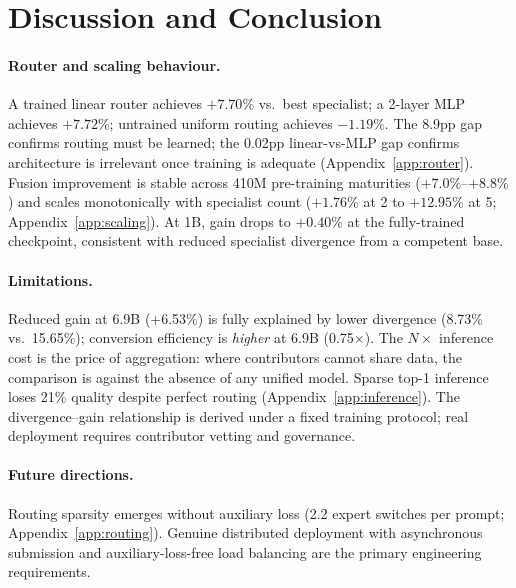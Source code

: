 \documentclass{article}
\begin{document}
\section{Discussion and Conclusion}
\label{sec:discussion}
\label{sec:conclusion}
\label{sec:analysis}

\paragraph{Router and scaling behaviour.} A trained linear router achieves $+7.70\%$ vs.\ best specialist; a 2-layer MLP achieves $+7.72\%$; untrained uniform routing achieves $-1.19\%$. The 8.9pp gap confirms routing must be learned; the 0.02pp linear-vs-MLP gap confirms architecture is irrelevant once training is adequate (Appendix~\ref{app:router}). Fusion improvement is stable across 410M pre-training maturities ($+7.0\%$--$+8.8\%$) and scales monotonically with specialist count ($+1.76\%$ at 2 to $+12.95\%$ at 5; Appendix~\ref{app:scaling}). At 1B, gain drops to $+0.40\%$ at the fully-trained checkpoint, consistent with reduced specialist divergence from a competent base.

\paragraph{Limitations.} Reduced gain at 6.9B (+6.53\%) is fully explained by lower divergence (8.73\% vs.\ 15.65\%); conversion efficiency is \emph{higher} at 6.9B (0.75$\times$). The $N\times$ inference cost is the price of aggregation: where contributors cannot share data, the comparison is against the absence of any unified model. Sparse top-1 inference loses 21\% quality despite perfect routing (Appendix~\ref{app:inference}). The divergence--gain relationship is derived under a fixed training protocol; real deployment requires contributor vetting and governance.

\paragraph{Future directions.} Routing sparsity emerges without auxiliary loss (2.2 expert switches per prompt; Appendix~\ref{app:routing}). Genuine distributed deployment with asynchronous submission and auxiliary-loss-free load balancing \citep{liu2024deepseekv3} are the primary engineering requirements.
\end{document}
